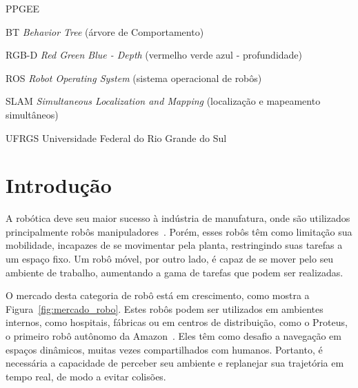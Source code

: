 \documentclass[repeatfields,xlists,xpacks,oneside,yearsonly]{ufrgscca}
\begin{document}
\setcounter{tocdepth}{3}

\listoffigures

\listoftables

\begin{listofabbrv}{PPGEE}
    \item[BT] \textit{Behavior Tree} (árvore de Comportamento)
    \item[RGB-D] \textit{Red Green Blue - Depth} (vermelho verde azul -
    profundidade)
    \item[ROS] \textit{Robot Operating System} (sistema operacional de robôs)
    \item[SLAM] \textit{Simultaneous Localization and Mapping} (localização e
    mapeamento simultâneos)
    \item[UFRGS] Universidade Federal do Rio Grande do Sul
\end{listofabbrv}


\tableofcontents

\chapter{Introdução}

A robótica deve seu maior sucesso à indústria de manufatura, onde são
utilizados principalmente robôs
manipuladores~\cite{IntroductionToMobileRobots}. Porém, esses robôs
têm como limitação sua mobilidade, incapazes de se movimentar pela
planta, restringindo suas tarefas a um espaço fixo. Um robô móvel,
por outro lado, é capaz de se mover pelo seu ambiente de trabalho,
aumentando a gama de tarefas que podem ser realizadas.

O mercado desta categoria de robô está em crescimento, como mostra a
Figura~\ref{fig:mercado_robo}. Estes robôs podem ser utilizados em
ambientes internos, como hospitais, fábricas ou em centros de
distribuição, como o Proteus, o primeiro robô autônomo da
Amazon~\cite{amazon_robot}. Eles têm como desafio a navegação em
espaços dinâmicos, muitas vezes compartilhados com humanos. Portanto,
é necessária a capacidade de perceber seu ambiente e replanejar sua
trajetória em tempo real, de modo a evitar colisões.
\end{document}
